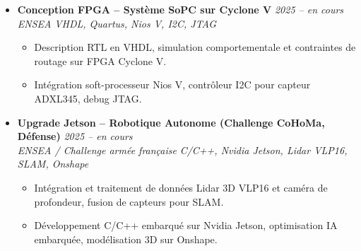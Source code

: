 \documentclass[a4paper,11pt]{article}
\begin{document}
\begin{itemize}[leftmargin=*, label={-}]
\item \textbf{Conception FPGA -- Système SoPC sur Cyclone V} \hfill \textit{2025 -- en cours} \\
\textit{ENSEA} \hfill \textit{VHDL, Quartus, Nios V, I2C, JTAG}
\vspace{-2pt}
    \begin{itemize}[leftmargin=0.4cm, nosep, label=\tiny$\bullet$]
        \item \small{Description RTL en VHDL, simulation comportementale et contraintes de routage sur FPGA Cyclone V.}
        \item \small{Intégration soft-processeur Nios V, contrôleur I2C pour capteur ADXL345, debug JTAG.}
    \end{itemize}
\vspace{3pt}

\item \textbf{Upgrade Jetson -- Robotique Autonome (Challenge CoHoMa, Défense)} \hfill \textit{2025 -- en cours} \\
\textit{ENSEA / Challenge armée française} \hfill \textit{C/C++, Nvidia Jetson, Lidar VLP16, SLAM, Onshape}
\vspace{-2pt}
    \begin{itemize}[leftmargin=0.4cm, nosep, label=\tiny$\bullet$]
        \item \small{Intégration et traitement de données Lidar 3D VLP16 et caméra de profondeur, fusion de capteurs pour SLAM.}
        \item \small{Développement C/C++ embarqué sur Nvidia Jetson, optimisation IA embarquée, modélisation 3D sur Onshape.}
    \end{itemize}

\end{itemize}

\end{document}
